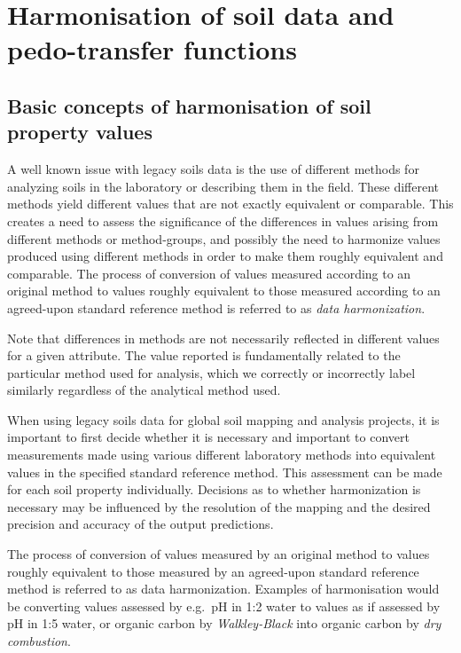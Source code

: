 \documentclass[11pt]{krantz}
\theoremstyle{definition}
\theoremstyle{definition}
\theoremstyle{definition}
\theoremstyle{remark}
\begin{document}
\hypertarget{harmonisation-of-soil-data-and-pedo-transfer-functions}{%
\section{Harmonisation of soil data and pedo-transfer
functions}\label{harmonisation-of-soil-data-and-pedo-transfer-functions}}

\hypertarget{basic-concepts-of-harmonisation-of-soil-property-values}{%
\subsection{Basic concepts of harmonisation of soil property
values}\label{basic-concepts-of-harmonisation-of-soil-property-values}}

A well known issue with legacy soils data is the use of different
methods for analyzing soils in the laboratory or describing them in the
field. These different methods yield different values that are not
exactly equivalent or comparable. This creates a need to assess the
significance of the differences in values arising from different methods
or method-groups, and possibly the need to harmonize values produced
using different methods in order to make them roughly equivalent and
comparable. The process of conversion of values measured according to an
original method to values roughly equivalent to those measured according
to an agreed-upon standard reference method is referred to as \emph{data
harmonization}.

Note that differences in methods are not necessarily reflected in
different values for a given attribute. The value reported is
fundamentally related to the particular method used for analysis, which
we correctly or incorrectly label similarly regardless of the analytical
method used.

When using legacy soils data for global soil mapping and analysis
projects, it is important to first decide whether it is necessary and
important to convert measurements made using various different
laboratory methods into equivalent values in the specified standard
reference method. This assessment can be made for each soil property
individually. Decisions as to whether harmonization is necessary may be
influenced by the resolution of the mapping and the desired precision
and accuracy of the output predictions.

The process of conversion of values measured by an original method to
values roughly equivalent to those measured by an agreed-upon standard
reference method is referred to as data harmonization. Examples of
harmonisation would be converting values assessed by e.g.~pH in 1:2
water to values as if assessed by pH in 1:5 water, or organic carbon by
\emph{Walkley-Black} into organic carbon by \emph{dry combustion}.
\end{document}
